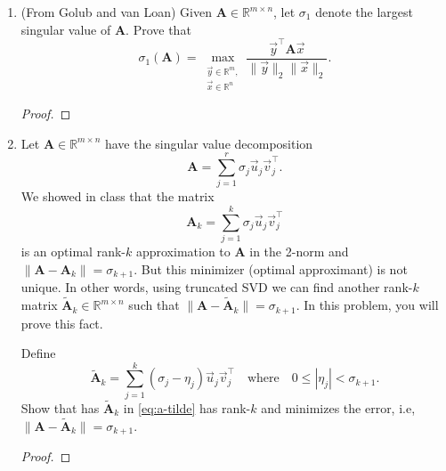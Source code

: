 \documentclass{article}
\theoremstyle{definition}
\newtheorem*{answer}{Answer}
\newcommand{\reals} {\mathbb{R}}
\newcommand{\mat}[1]{\bm{#1}}
\begin{document}
\begin{enumerate}[leftmargin=\labelsep]
\begin{enumerate}
\begin{answer}
		            \end{answer}

		      \item Form the optimal rank-1 approximation \(\mat{A}_1\) to \(\mat{A}\) in the 2-norm? What is the error matrix \(\mat{A} - \mat{A}_1\), and what is the norm of the error \(\|\mat{A} - \mat{A}_1\|_2\)? The error matrix and the norm of the error follow directly from the SVD; no computation is needed.
		            \begin{answer}

		            \end{answer}
	      \end{enumerate}

	\item (From Golub and van Loan) Given \(\mat{A} \in \reals^{m \times n}\), let \(\sigma_1\) denote the largest singular value of \(\mat{A}\). Prove that
	      \[
		      \sigma_1(\mat{A}) = \max_{\substack{\vec{y} \in \reals^m, \\ \vec{x} \in \reals^n}} \frac{\vec{y}^\top \mat{A} \vec{x}}{\|\vec{y}\|_2\|\vec{x}\|_2}.
	      \]
	      \begin{proof}
	      \end{proof}

	\item Let \(\mat{A} \in \reals^{m \times n}\) have the singular value decomposition
	      \[
		      \mat{A} = \sum_{j = 1}^r \sigma_j \vec{u}_j\vec{v}_j^\top.
	      \]
	      We showed in class that the matrix
	      \[
		      \mat{A}_k = \sum_{j = 1}^k \sigma_j \vec{u}_j\vec{v}_j^\top
	      \]
	      is an optimal rank-\(k\) approximation to \(\mat{A}\) in the 2-norm and \(\|\mat{A} - \mat{A}_k\| = \sigma_{k+1}\). But this minimizer (optimal approximant) is not unique. In other words, using truncated SVD we can find another rank-\(k\) matrix \(\tilde{\mat{A}}_k \in \reals^{m\times n}\) such that \(\|\mat{A} - \tilde{\mat{A}}_k\| = \sigma_{k+1}\). In this problem, you will prove this fact.

	      Define
	      \begin{equation}
		      \tilde{\mat{A}}_k = \sum_{j = 1}^k(\sigma_j - \eta_j)\vec{u}_j\vec{v}_j^\top \quad \text{where} \quad 0 \leq |\eta_j| < \sigma_{k + 1}. \label{eq:a-tilde}
	      \end{equation}
	      Show that has \(\tilde{\mat{A}}_k\) in \eqref{eq:a-tilde} has rank-\(k\) and minimizes the error, i.e, \(\|\mat{A} - \tilde{\mat{A}}_k\| = \sigma_{k+1}\).
	      \begin{proof}


\end{proof}
\end{enumerate}
\end{document}
